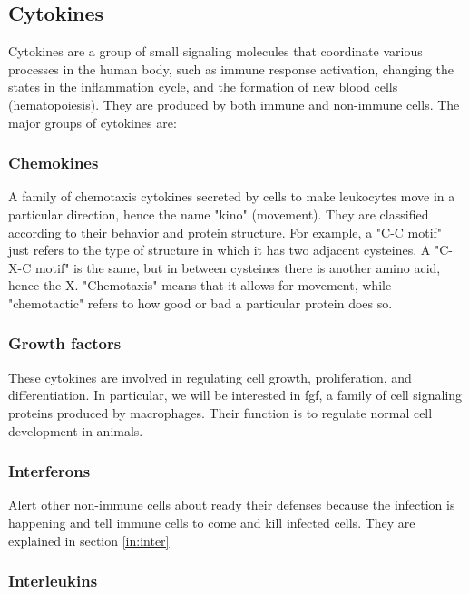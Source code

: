 \subsection{Cytokines}
\label{ref:inflammationCytokines}

Cytokines are a group of small signaling molecules that coordinate various processes in the human body, such as immune response activation, changing the states in the inflammation cycle, and the formation of new blood cells (hematopoiesis). They are produced by both immune and non-immune cells. The major groups of cytokines are:

\subsubsection{Chemokines}

    A family of chemotaxis cytokines secreted by cells to make leukocytes move in a particular direction, hence the name "kino" (movement). They are classified according to their behavior and protein structure. For example, a "C-C motif" just refers to the type of structure in which it has two adjacent cysteines. A "C-X-C motif" is the same, but in between cysteines there is another amino acid, hence the X. "Chemotaxis" means that it allows for movement, while "chemotactic" refers to how good or bad a particular protein does so.

\subsubsection{Growth factors}
\label{in:GF}

    These cytokines are involved in regulating cell growth, proliferation, and differentiation. In particular, we will be interested in \gls{fgf}, a family of cell signaling proteins produced by macrophages. Their function is to regulate normal cell development in animals.

\subsubsection{Interferons}

    Alert other non-immune cells about ready their defenses because the infection is happening and tell immune cells to come and kill infected cells. They are explained in section \ref{in:inter}

\subsubsection{Interleukins}

